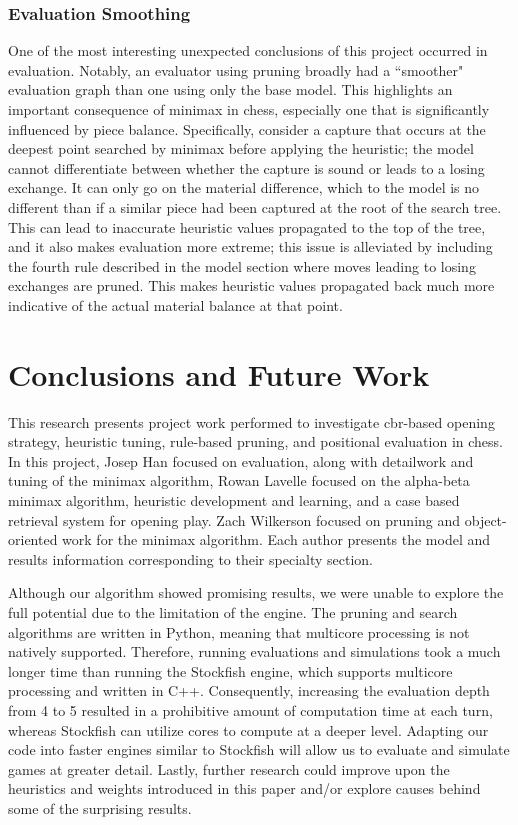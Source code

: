\documentclass[letterpaper]{article}
\begin{document}
\subsubsection{Evaluation Smoothing}
One of the most interesting unexpected conclusions of this project occurred in evaluation.  Notably, an evaluator using pruning broadly had a ``smoother" evaluation graph than one using only the base model.  This highlights an important consequence of minimax in chess, especially one that is significantly influenced by piece balance.  Specifically, consider a capture that occurs at the deepest point searched by minimax before applying the heuristic; the model cannot differentiate between whether the capture is sound or leads to a losing exchange.  It can only go on the material difference, which to the model is no different than if a similar piece had been captured at the root of the search tree.  This can lead to inaccurate heuristic values propagated to the top of the tree, and it also makes evaluation more extreme; this issue is alleviated by including the fourth rule described in the model section where moves leading to losing exchanges are pruned.  This makes heuristic values propagated back much more indicative of the actual material balance at that point.

\section{Conclusions and Future Work}
This research presents project work performed to investigate \acrshort{cbr}-based opening strategy, heuristic tuning, rule-based pruning, and positional evaluation in chess.  In this project, Josep Han focused on evaluation, along with detailwork and tuning of the minimax algorithm, Rowan Lavelle focused on the alpha-beta minimax algorithm, heuristic development and learning, and a case based retrieval system for opening play. Zach Wilkerson focused on pruning and object-oriented work for the minimax algorithm.  Each author presents the model and results information corresponding to their specialty section.

Although our algorithm showed promising results, we were unable to explore the full potential due to the limitation of the engine. The pruning and search algorithms are written in Python, meaning that multicore processing is not natively supported. Therefore, running evaluations and simulations took a much longer time than running the Stockfish engine, which supports multicore processing and written in C++. Consequently, increasing the evaluation depth from 4 to 5 resulted in a prohibitive amount of computation time at each turn, whereas Stockfish can utilize cores to compute at a deeper level. Adapting our code into faster engines similar to Stockfish will allow us to evaluate and simulate games at greater detail.  Lastly, further research could improve upon the heuristics and weights introduced in this paper and/or explore causes behind some of the surprising results.



\end{document}
